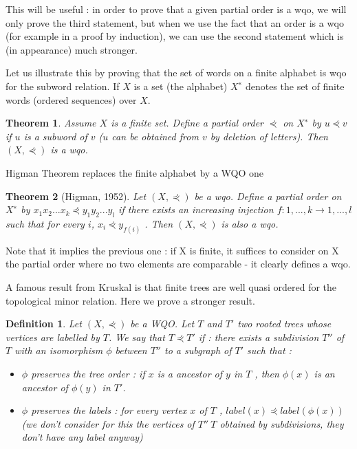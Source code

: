 \documentclass[12pt,a4paper]{article}
\newtheorem{theorem}{Theorem}
\newtheorem{definition}{Definition}
\begin{document}
This will be useful : in order to prove that a given partial order is a wqo, we will
only prove the third statement, but when we use the fact that an order is a wqo (for
example in a proof by induction), we can use the second statement which is (in
appearance) much stronger.

Let us illustrate this by proving that the set of words on a finite alphabet is wqo for
the subword relation. If $X$ is a set (the alphabet) $X^∗$ denotes the set of finite words
(ordered sequences) over $X$.

\begin{theorem}
Assume $X$ is a finite set. Define a partial order $\curlyeqprec$ on $X^∗$ by $u \curlyeqprec v$ if $u$ is a subword
of $v$ ($u$ can be obtained from $v$ by deletion of letters). Then $( X , \curlyeqprec)$ is a wqo.
\end{theorem}

Higman Theorem replaces the finite alphabet by a WQO one
\begin{theorem}[Higman, 1952]
Let $( X , \curlyeqprec)$ be a wqo. Define a partial order on $X^∗$ by $x_1 x_2 . . . x_k  \curlyeqprec  y_1 y_2 . . . y_l$ if there
exists an increasing injection $f : { 1 , . . . , k } → { 1 , . . . , l }$ such that for every $i$,
$x_i \curlyeqprec  y_{f ( i )}$ . Then $( X , \curlyeqprec)$ is also a wqo.
\end{theorem}

Note that it implies the previous one : if X is finite, it suffices to consider on X the
partial order where no two elements are comparable - it clearly defines a wqo.

A famous result from Kruskal is that finite trees are well quasi ordered for the
topological minor relation. Here we prove a stronger result.

\begin{definition}
Let $( X , \curlyeqprec)$ be a WQO. Let $T$ and $T'$ two rooted trees whose vertices are labelled
by $T$. We say that $T \curlyeqprec T'$ if :
there exists a subdivision $T''$ of $T$ with an isomorphism $\phi$ between $T''$ to a
subgraph of $T'$ such that :
\begin{itemize}
\item $\phi$ preserves the tree order : if $x$ is a ancestor of $y$ in $T$ , then $\phi( x )$ is an
ancestor of $\phi( y )$ in $T'$.
\item $\phi$ preserves the labels : for every vertex $x$ of $T$ , $label( x )  \curlyeqprec label(\phi( x ))$ (we
don’t consider for this the vertices of $T''\ T$ obtained by subdivisions, they
don’t have any label anyway)
\end{itemize}
\end{definition}
\end{document}
